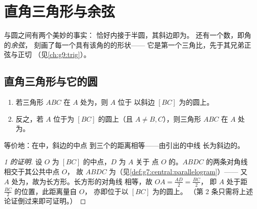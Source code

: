\chapter{直角三角形与余弦}\label{ch:g8:cosine}

与圆之间有两个美妙的事实：
恰好内接于半圆，其斜边即为。
还有一个数，即角的\emph{余弦}，
刻画了每一个具有该角的的形状——
它是第一个三角比，先于其兄弟正弦与正切
（见\cref{ch:g9:trig}）。

\section{直角三角形与它的圆}

\begin{theorem}[圆定理]\label{thm:g8:cosine:circle}
\begin{enumerate}
  \item 若三角形 $ABC$ 在 $A$ 处为，则 $A$ 位于
        以斜边 $[BC]$ 为的圆上。
  \item 反之，若 $A$ 位于为 $[BC]$ 的圆上（且
        $A \neq B, C$），则三角形 $ABC$ 在
        $A$ 处为。
\end{enumerate}
等价地：在中，斜边的中点
到三个的距离相等——由引出的中线
长为斜边的。
\end{theorem}

\begin{proof}[1 的证明]
设 $O$ 为 $[BC]$ 的中点，$D$ 为 $A$ 关于
点 $O$ 的。$ABDC$ 的两条对角线相交于其公共中点 $O$，
故 $ABDC$ 为（见\cref{def:g7:central:parallelogram}）——
又 $A$ 处为，故为长方形。长方形的对角线
相等，故 $OA = \frac{AD}{2} = \frac{BC}{2}$，
即 $A$ 处于距 $\frac{BC}{2}$ 的位置，此距离量自 $O$，
亦即位于以 $[BC]$ 为的圆上。
（第 2 条只需将上述论证倒过来即可证明。）
\end{proof}

